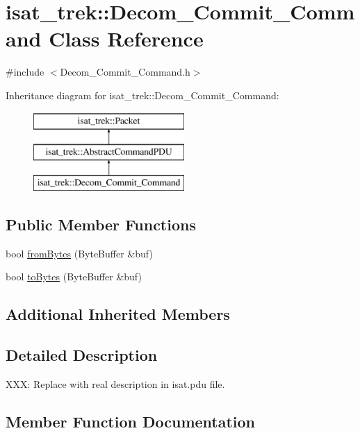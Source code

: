 \hypertarget{classisat__trek_1_1_decom___commit___command}{}\section{isat\+\_\+trek\+:\+:Decom\+\_\+\+Commit\+\_\+\+Command Class Reference}
\label{classisat__trek_1_1_decom___commit___command}


{\ttfamily \#include $<$Decom\+\_\+\+Commit\+\_\+\+Command.\+h$>$}

Inheritance diagram for isat\+\_\+trek\+:\+:Decom\+\_\+\+Commit\+\_\+\+Command\+:\begin{figure}[H]
\begin{center}
\leavevmode
\includegraphics[height=3.000000cm]{classisat__trek_1_1_decom___commit___command}
\end{center}
\end{figure}
\subsection*{Public Member Functions}
\begin{DoxyCompactItemize}
\item 
bool \hyperlink{classisat__trek_1_1_decom___commit___command_a22eb09166f279f873a8f9fb7d82137c9}{from\+Bytes} (Byte\+Buffer \&buf)
\item 
bool \hyperlink{classisat__trek_1_1_decom___commit___command_a5e07be18b1edb1669e06bca197f3376e}{to\+Bytes} (Byte\+Buffer \&buf)
\end{DoxyCompactItemize}
\subsection*{Additional Inherited Members}


\subsection{Detailed Description}
X\+XX\+: Replace with real description in isat.\+pdu file. 

\subsection{Member Function Documentation}
